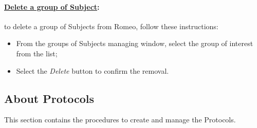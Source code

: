 \paragraph{\underline{Delete a group of Subject}:} to delete a group of Subjects\g{} from Romeo, follow these instructions:
\begin{itemize}
\item From the groups of Subjects\g{} managing window, select the group of interest from the list;
\item Select the \textit{Delete} button to confirm the removal.
\end{itemize}

\subsection{About Protocols}
\label{manageprotocols}
This section contains the procedures to create and manage the Protocols\g{}.

